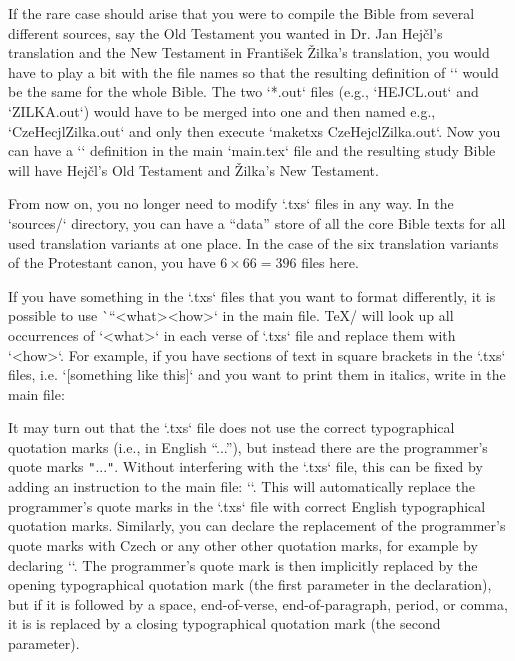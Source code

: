 If the rare case should arise that you were to compile the Bible from several different sources, say the Old Testament you wanted in Dr. Jan Hejčl's translation and the New Testament in František Žilka's translation, you would have to play a bit with the file names so that the resulting definition of `\tmark` would be the same for the whole Bible. The two `*.out` files (e.g., `HEJCL.out` and `ZILKA.out`) would have to be merged into one and then named e.g., `CzeHecjlZilka.out` and  only then execute `maketxs CzeHejclZilka.out`.  Now you can have a `\def\tmark{HejclZilka}` definition in the main `main.tex` file and 
the resulting study Bible will have Hejčl's Old Testament and Žilka's New Testament.




From now on, you no longer need to modify  `.txs` files in any way.
In the `sources/` directory, you can have a “data” store of all the core Bible texts for all used translation variants at one place. In the case of the six translation variants
of the Protestant canon, you have $6 \times 66=396$ files here.



If you have something in the `.txs` files that you want to format differently, it is 
possible to use \`\cnvtext``{<what>}{<how>}` in the main file. 
\TeX/  will look up all occurrences of `<what>` in each verse of `.txs` file and replace them with `<how>`.
For example, if you have sections of text in square brackets in the `.txs` files, i.e.
`[something like this]` and you want to print them in italics, write in the main file:
\begtt
\cnvtext{[}{\bgroup\it} \cnvtext{]}{\/\egroup}
\endtt

It may turn out that the `.txs` file does not use the correct typographical quotation marks (i.e., in English “...”), but instead there are the programmer's quote marks {\tt"}...{\tt"}. 
Without interfering with the `.txs` file, this can be fixed by adding an instruction to
the main file:
``.
This will automatically replace the programmer's quote marks in the `.txs` file with correct English  typographical quotation marks. 
Similarly, you can declare the replacement of the programmer's quote marks
with Czech or any other other quotation marks, for example by declaring
``.
The programmer's quote mark is then implicitly
replaced by the opening typographical quotation mark (the first parameter in the 
declaration), but if it is followed by a space, end-of-verse, end-of-paragraph, period, 
or comma, it is is replaced by a closing typographical quotation mark (the second 
parameter).

